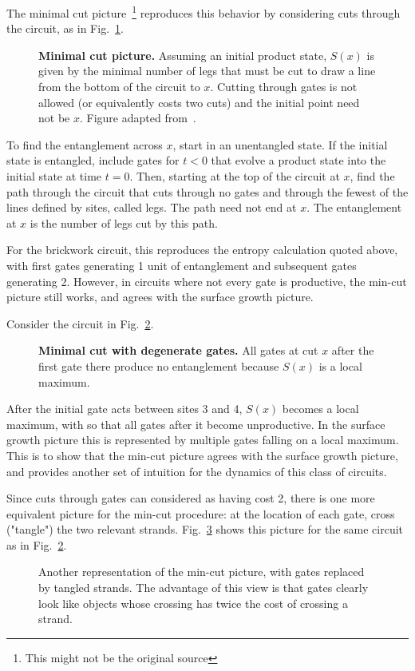 The minimal cut picture~\cite{Nahum2017}\footnote{This might not be the original source} reproduces this behavior by considering cuts through the circuit, as in Fig.~\ref{fig:mincut}.
\begin{figure}
	\centering
	
	\caption{\textbf{Minimal cut picture.} Assuming an initial product state, $S(x)$ is given by the minimal number of legs that must be cut to draw a line from the bottom of the circuit to $x$. Cutting through gates is not allowed (or equivalently costs two cuts) and the initial point need not be $x$. Figure adapted from~\cite{Nahum2017}.}
	\label{fig:mincut}
\end{figure}
To find the entanglement across $x$, start in an unentangled state. If the initial state is entangled, include gates for $t<0$ that evolve a product state into the initial state at time $t=0$. Then, starting at the top of the circuit at $x$, find the path through the circuit that cuts through no gates and through the fewest of the lines defined by sites, called legs. The path need not end at $x$. The entanglement at $x$ is the number of legs cut by this path. 

For the brickwork circuit, this reproduces the entropy calculation quoted above, with first gates generating 1 unit of entanglement and subsequent gates generating 2. However, in circuits where not every gate is productive, the min-cut picture still works, and agrees with the surface growth picture.

Consider the circuit in Fig.~\ref{fig:degeneratemincut}.
\begin{figure}
	\centering
	
	\caption{\textbf{Minimal cut with degenerate gates.} All gates at cut $x$ after the first gate there produce no entanglement because $S(x)$ is a local maximum.}
	\label{fig:degeneratemincut}
\end{figure}
After the initial gate acts between sites 3 and 4, $S(x)$ becomes a local maximum, with so that all gates after it become unproductive. In the surface growth picture this is represented by multiple gates falling on a local maximum. This is to show that the min-cut picture agrees with the surface growth picture, and provides another set of intuition for the dynamics of this class of circuits.

Since cuts through gates can considered as having cost 2, there is one more equivalent picture for the min-cut procedure: at the location of each gate, cross ("tangle") the two relevant strands. Fig.~\ref{fig:anothermincut} shows this picture for the same circuit as in Fig.~\ref{fig:degeneratemincut}.
\begin{figure}
	\centering
	
	\caption{Another representation of the min-cut picture, with gates replaced by tangled strands. The advantage of this view is that gates clearly look like objects whose crossing has twice the cost of crossing a strand.}
	\label{fig:anothermincut}
\end{figure}

